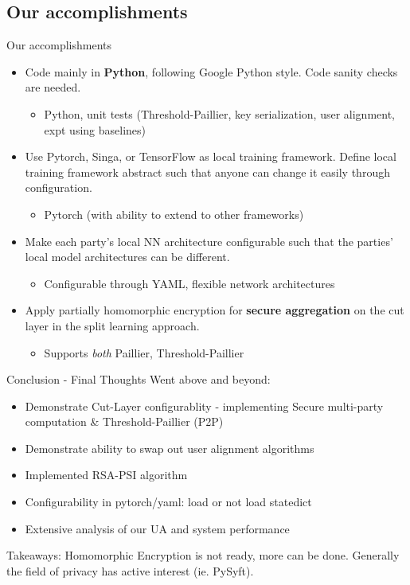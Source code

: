 \documentclass[xcolor=dvipsnames]{beamer}
\begin{document}
\subsection{Our accomplishments}
\begin{frame}{Our accomplishments}
  \begin{itemize}
    \item Code mainly in {\bf Python}, following Google Python style. Code sanity checks are needed.
        \begin{itemize}
            \item [\checkmark] Python, unit tests (Threshold-Paillier, key serialization, user alignment, expt using baselines)
        \end{itemize}
    \item Use Pytorch, Singa, or TensorFlow as local training framework. Define local training framework abstract such that anyone can change it easily through configuration.
        \begin{itemize}
            \item [\checkmark] Pytorch (with ability to extend to other frameworks)
        \end{itemize}
    \item Make each party’s local NN architecture configurable such that the parties’ local model architectures can be different.
        \begin{itemize}
            \item [\checkmark] Configurable through YAML, flexible network architectures
        \end{itemize}
    \item Apply partially homomorphic encryption for {\bf secure aggregation} on the cut layer in the split learning approach.
        \begin{itemize}
            \item [\checkmark] Supports \emph{both} Paillier, Threshold-Paillier
        \end{itemize}
  \end{itemize}
\end{frame}

\begin{frame}{Conclusion - Final Thoughts}
  Went above and beyond:
  \begin{itemize}
    \item Demonstrate Cut-Layer configurablity - implementing Secure multi-party computation \& Threshold-Paillier (P2P)
    \item Demonstrate ability to swap out user alignment algorithms
    \item Implemented RSA-PSI algorithm
    \item Configurability in pytorch/yaml: load or not load statedict
    \item Extensive analysis of our UA and system performance
  \end{itemize}
  Takeaways: Homomorphic Encryption is not ready, more can be done. 
  Generally the field of privacy has active interest (ie. PySyft).
\end{frame}
\end{document}
